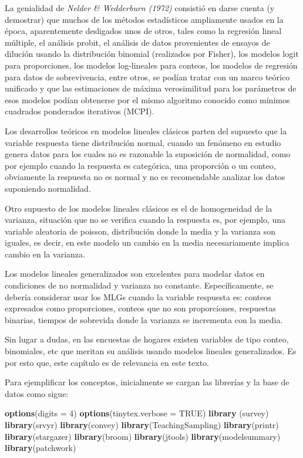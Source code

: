 \documentclass[
  12pt,
]{book}
\newenvironment{Shaded}{\begin{snugshade}}{\end{snugshade}}
\newcommand{\AttributeTok}[1]{\textcolor[rgb]{0.13,0.29,0.53}{#1}}
\newcommand{\ConstantTok}[1]{\textcolor[rgb]{0.56,0.35,0.01}{#1}}
\newcommand{\DecValTok}[1]{\textcolor[rgb]{0.00,0.00,0.81}{#1}}
\newcommand{\FunctionTok}[1]{\textcolor[rgb]{0.13,0.29,0.53}{\textbf{#1}}}
\newcommand{\NormalTok}[1]{#1}
\begin{document}
La genialidad de \emph{Nelder \& Wedderburn (1972)} consistió en darse cuenta (y demostrar) que muchos de los métodos estadísticos ampliamente usados en la época, aparentemente desligados unos de otros, tales como la regresión lineal múltiple, el análisis probit, el análisis de datos provenientes de ensayos de dilución usando la distribución binomial (realizados por Fisher), los modelos logit para proporciones, los modelos log-lineales para conteos, los modelos de regresión para datos de sobrevivencia, entre otros, se podían tratar con un marco teórico unificado y que las estimaciones de máxima verosimilitud para los parámetros de esos modelos podían obtenerse por el mismo algoritmo conocido como mínimos cuadrados ponderados iterativos (MCPI).

Los desarrollos teóricos en modelos lineales clásicos parten del supuesto que la variable respuesta tiene distribución normal, cuando un fenómeno en estudio genera datos para los cuales no es razonable la suposición de normalidad, como por ejemplo cuando la respuesta es categórica, una proporción o un conteo, obviamente la respuesta no es normal y no es recomendable analizar los datos suponiendo normalidad.

Otro supuesto de los modelos lineales clásicos es el de homogeneidad de la varianza, situación que no se verifica cuando la respuesta
es, por ejemplo, una variable aleatoria de poisson, distribución donde la media y la varianza son iguales, es decir, en este modelo un cambio en la media necesariamente implica cambio en la varianza.

Los modelos lineales generalizados son excelentes para modelar datos en condiciones de no normalidad y varianza no constante. Específicamente, se debería considerar usar los MLGs cuando la variable respuesta es: conteos expresados como proporciones, conteos que no son proporciones, respuestas binarias, tiempos de sobrevida donde la varianza se incrementa con la media.

Sin lugar a dudas, en las encuestas de hogares existen variables de tipo conteo, binomiales, etc que meritan su análisis usando modelos lineales generalizados. Es por esto que, este capítulo es de relevancia en este texto.

Para ejemplificar los conceptos, inicialmente se cargan las librerías y la base de datos como sigue:

\begin{Shaded}
\begin{Highlighting}[]
\FunctionTok{options}\NormalTok{(}\AttributeTok{digits =} \DecValTok{4}\NormalTok{)}
\FunctionTok{options}\NormalTok{(}\AttributeTok{tinytex.verbose =} \ConstantTok{TRUE}\NormalTok{)}
\FunctionTok{library}\NormalTok{ (survey)}
\FunctionTok{library}\NormalTok{(srvyr)}
\FunctionTok{library}\NormalTok{(convey)}
\FunctionTok{library}\NormalTok{(TeachingSampling)}
\FunctionTok{library}\NormalTok{(printr)}
\FunctionTok{library}\NormalTok{(stargazer)}
\FunctionTok{library}\NormalTok{(broom)}
\FunctionTok{library}\NormalTok{(jtools)}
\FunctionTok{library}\NormalTok{(modelsummary)}
\FunctionTok{library}\NormalTok{(patchwork)}
\end{Highlighting}
\end{Shaded}
\end{document}
